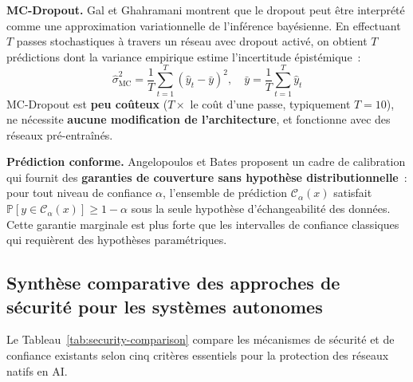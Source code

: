 \textbf{MC-Dropout.} Gal et Ghahramani \cite{gal2016dropout} montrent que le dropout peut être interprété comme une approximation variationnelle de l'inférence bayésienne. En effectuant $T$ passes stochastiques à travers un réseau avec dropout activé, on obtient $T$ prédictions dont la variance empirique estime l'incertitude épistémique~:
\begin{equation}
    \hat{\sigma}^2_{\text{MC}} = \frac{1}{T} \sum_{t=1}^{T} \left(\hat{y}_t - \bar{y}\right)^2, \quad \bar{y} = \frac{1}{T}\sum_{t=1}^T \hat{y}_t
\end{equation}
MC-Dropout est \textbf{peu coûteux} ($T \times$ le coût d'une passe, typiquement $T = 10$), ne nécessite \textbf{aucune modification de l'architecture}, et fonctionne avec des réseaux pré-entraînés.

\textbf{Prédiction conforme.} Angelopoulos et Bates \cite{angelopoulos2023conformal} proposent un cadre de calibration qui fournit des \textbf{garanties de couverture sans hypothèse distributionnelle}~: pour tout niveau de confiance $\alpha$, l'ensemble de prédiction $\mathcal{C}_\alpha(x)$ satisfait $\mathbb{P}[y \in \mathcal{C}_\alpha(x)] \geq 1 - \alpha$ sous la seule hypothèse d'échangeabilité des données. Cette garantie marginale est plus forte que les intervalles de confiance classiques qui requièrent des hypothèses paramétriques.

\subsection{Synthèse comparative des approches de sécurité pour les systèmes autonomes}

Le Tableau~\ref{tab:security-comparison} compare les mécanismes de sécurité et de confiance existants selon cinq critères essentiels pour la protection des réseaux natifs en AI.

